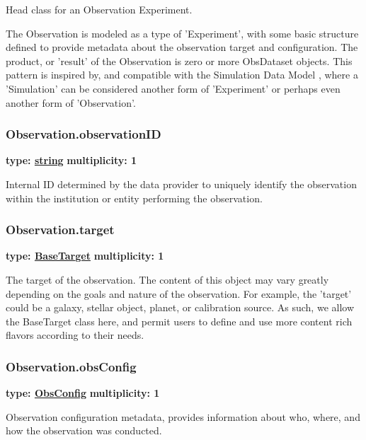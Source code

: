   Head class for an Observation Experiment.
  
  The Observation is modeled as a type of 'Experiment', with some basic
  structure defined to provide metadata about the observation target and
  configuration. The product, or 'result' of the Observation is zero or more
  ObsDataset objects. This pattern is inspired by, and compatible with the
  Simulation Data Model \citep{2012ivoa.spec.0503L}, where a 'Simulation' can be considered another form
  of 'Experiment' or perhaps even another form of 'Observation'.

  \subsubsection{Observation.observationID}
  \textbf{type: \hyperref[sect:ivoa]{string}} \newline
  \textbf{multiplicity: 1} \newline

  Internal ID determined by the data provider to uniquely identify the
  observation within the institution or entity performing the observation.  
  
  \subsubsection{Observation.target}
  \textbf{type: \hyperref[sect:basetarget]{BaseTarget}} \newline
  \textbf{multiplicity: 1} \newline

  The target of the observation. The content of this object may vary greatly
  depending on the goals and nature of the observation. For example, the
  'target' could be a galaxy, stellar object, planet, or calibration source. As
  such, we allow the BaseTarget class here, and permit users to define and use
  more content rich flavors according to their needs.
  
  \subsubsection{Observation.obsConfig}
  \textbf{type: \hyperref[sect:obsconfig]{ObsConfig}} \newline
  \textbf{multiplicity: 1} \newline

  Observation configuration metadata, provides information about who, where,
  and how the observation was conducted.
  
